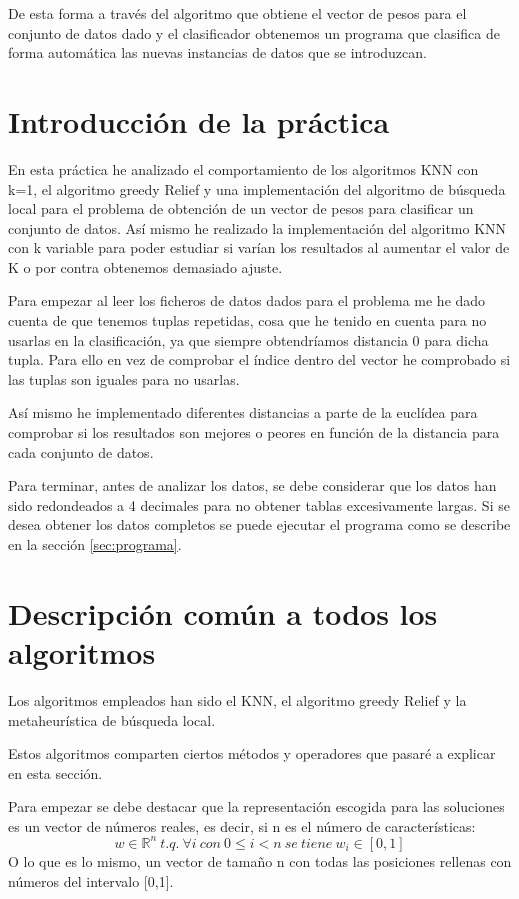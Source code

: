\documentclass[12pt,a4paper]{article}
\begin{document}
	De esta forma a través del algoritmo que obtiene el vector de pesos para el conjunto de datos dado y el clasificador obtenemos un programa que clasifica de forma automática las nuevas instancias de datos que se introduzcan.
	
	\newpage

	\section{Introducción de la práctica}
	\label{sec:introPractica}
	
	En esta práctica he analizado el comportamiento de los algoritmos KNN con k=1, el algoritmo greedy Relief y una implementación del algoritmo de búsqueda local para el problema de obtención de un vector de pesos para clasificar un conjunto de datos. Así mismo he realizado la implementación del algoritmo KNN con k variable para poder estudiar si varían los resultados al aumentar el valor de K o por contra obtenemos demasiado ajuste.
	
	Para empezar al leer los ficheros de datos dados para el problema me he dado cuenta de que tenemos tuplas repetidas, cosa que he tenido en cuenta para no usarlas en la clasificación, ya que siempre obtendríamos distancia 0 para dicha tupla. Para ello en vez de comprobar el índice dentro del vector he comprobado si las tuplas son iguales para no usarlas.
	
	Así mismo he implementado diferentes distancias a parte de la euclídea para comprobar si los resultados son mejores o peores en función de la distancia para cada conjunto de datos.
	
	Para terminar, antes de analizar los datos, se debe considerar que los datos han sido redondeados a 4 decimales para no obtener tablas excesivamente largas. Si se desea obtener los datos completos se puede ejecutar el programa como se describe en la sección \hyperref[sec:programa]{\ref{sec:programa}}.


	\section{Descripción común a todos los algoritmos}
	Los algoritmos empleados han sido el KNN, el algoritmo greedy Relief y la metaheurística de búsqueda local. 
	
	Estos algoritmos comparten ciertos métodos y operadores que pasaré a explicar en esta sección.
	
	Para empezar se debe destacar que la representación escogida para las soluciones es un vector de números reales, es decir, si n es el número de características:
	$$w\in \mathbb{R}^n \ t.q. \ \forall i \ con \ 0\leq i < n \ se \ tiene \ w_i \in [0,1]$$
	O lo que es lo mismo, un vector de tamaño n con todas las posiciones rellenas con números del intervalo [0,1]. 
	
\end{document}
